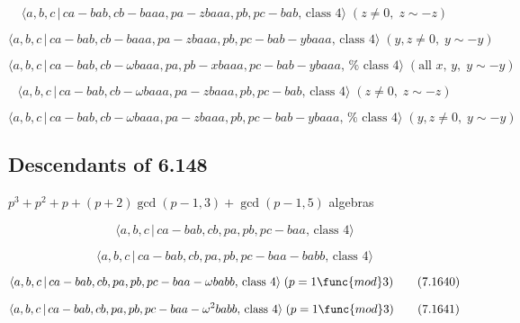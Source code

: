 \documentclass[10pt]{article}
\begin{document}
\begin{equation}
\langle a,b,c\,|\,ca-bab,cb-baaa,pa-zbaaa,pb,pc-bab,\,\text{class }4\rangle
\;(z\neq 0,\;z\sim -z)  \tag{7.1633}
\end{equation}

\begin{equation}
\langle a,b,c\,|\,ca-bab,cb-baaa,pa-zbaaa,pb,pc-bab-ybaaa,\,\text{class }%
4\rangle \;(y,z\neq 0,\;y\sim -y)  \tag{7.1634}
\end{equation}

\begin{equation}
\langle a,b,c\,|\,ca-bab,cb-\omega baaa,pa,pb-xbaaa,pc-bab-ybaaa,\,\text{%
class }4\rangle \;(\text{all }x,\,y,\;y\sim -y)  \tag{7.1635}
\end{equation}

\begin{equation}
\langle a,b,c\,|\,ca-bab,cb-\omega baaa,pa-zbaaa,pb,pc-bab,\,\text{class }%
4\rangle \;(z\neq 0,\;z\sim -z)  \tag{7.1636}
\end{equation}

\begin{equation}
\langle a,b,c\,|\,ca-bab,cb-\omega baaa,pa-zbaaa,pb,pc-bab-ybaaa,\,\text{%
class }4\rangle \;(y,z\neq 0,\;y\sim -y)  \tag{7.1637}
\end{equation}

\subsection{Descendants of 6.148}

$p^{3}+p^{2}+p+(p+2)\gcd (p-1,3)+\gcd (p-1,5)$ algebras

\begin{equation}
\langle a,b,c\,|\,ca-bab,cb,pa,pb,pc-baa,\,\text{class }4\rangle 
\tag{7.1638}
\end{equation}

\begin{equation}
\langle a,b,c\,|\,ca-bab,cb,pa,pb,pc-baa-babb,\,\text{class }4\rangle 
\tag{7.1639}
\end{equation}

\begin{equation}
\langle a,b,c\,|\,ca-bab,cb,pa,pb,pc-baa-\omega babb,\,\text{class }4\rangle
\;(p=1\func{mod}3)  \tag{7.1640}
\end{equation}

\begin{equation}
\langle a,b,c\,|\,ca-bab,cb,pa,pb,pc-baa-\omega ^{2}babb,\,\text{class }%
4\rangle \;(p=1\func{mod}3)  \tag{7.1641}
\end{equation}
\end{document}
